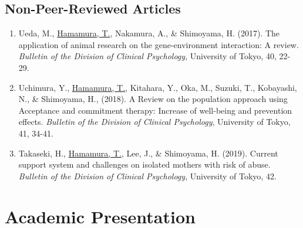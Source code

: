 \documentclass{article}
\begin{document}
\subsection{Non-Peer-Reviewed Articles}
\begin{enumerate}
	\item Ueda, M., \underline{Hamamura, T.}, Nakamura, A., \& Shimoyama, H. (2017). The application of animal research on the gene-environment interaction: A review. \textit{Bulletin of the Division of Clinical Psychology}, University of Tokyo, 40, 22-29.
	\item Uchimura, Y., \underline{Hamamura, T.}, Kitahara, Y., Oka, M., Suzuki, T., Kobayashi, N., \& Shimoyama, H., (2018). A Review on the population approach using Acceptance and commitment therapy: Increase of well-being and prevention effects. \textit{Bulletin of the Division of Clinical Psychology}, University of Tokyo, 41, 34-41.
	\item Takaseki, H., \underline{Hamamura, T.}, Lee, J., \& Shimoyama, H. (2019). Current support system and challenges on isolated mothers with risk of abuse. \textit{Bulletin of the Division of Clinical Psychology}, University of Tokyo, 42.
\end{enumerate}

\section{Academic Presentation}
\end{document}
